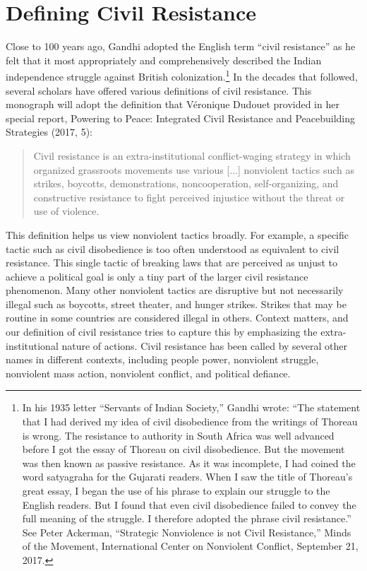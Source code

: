 \documentclass[twoside,a4paper,12pt,fleqn,openany]{extbook}
\begin{document}
\section*{Defining Civil Resistance}

Close to 100 years ago, Gandhi adopted the English term “civil resistance” as he felt that it most appropriately and comprehensively described the Indian independence struggle against British colonization.\footnote{In his 1935 letter “Servants of Indian Society,” Gandhi wrote: “The statement that I had derived my idea of civil disobedience from the writings of Thoreau is wrong. The resistance to authority in South Africa was well advanced before I got the essay of Thoreau on civil disobedience. But the movement was then known as passive resistance. As it was incomplete, I had coined the word satyagraha for the Gujarati readers. When I saw the title of Thoreau’s great essay, I began the use of his phrase to explain our struggle to the English readers. But I found that even civil disobedience failed to convey the full meaning of the struggle. I therefore adopted the phrase civil resistance.” See Peter Ackerman, “Strategic Nonviolence is not Civil Resistance,” Minds of the Movement, International Center on Nonviolent Conflict, September 21, 2017.} In the decades that followed, several scholars have offered various definitions of civil resistance. This monograph will adopt the definition that Véronique Dudouet provided in her special report, Powering to Peace: Integrated Civil Resistance and Peacebuilding Strategies (2017, 5):

\begin{quote}
Civil resistance is an extra-institutional conflict-waging strategy in which organized grassroots movements use various [...] nonviolent tactics such as strikes, boycotts, demonstrations, noncooperation, self-organizing, and constructive resistance to fight perceived injustice without the threat or use of violence.
\end{quote}

This definition helps us view nonviolent tactics broadly. For example, a specific tactic such as civil disobedience is too often understood as equivalent to civil resistance. This single tactic of breaking laws that are perceived as unjust to achieve a political goal is only a tiny part of the larger civil resistance phenomenon. Many other nonviolent tactics are disruptive but not necessarily illegal such as boycotts, street theater, and hunger strikes. Strikes that may be routine in some countries are considered illegal in others. Context matters, and our definition of civil resistance tries to capture this by emphasizing the extra-institutional nature of actions. Civil resistance has been called by several other names in different contexts, including people power, nonviolent struggle, nonviolent mass action, nonviolent conflict, and
political defiance.
\end{document}
